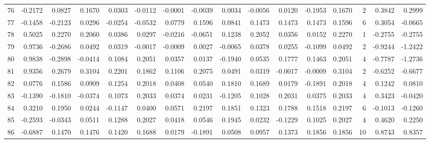 \begin{tabular}{lrrrrrrrrrrrrrrr}
76  &     -0.2172 &  0.0827 &  0.1670 &  0.0303 & -0.0112 & -0.0001 & -0.0039 &  0.0034 & -0.0056 &  0.0120 &  -0.1953 &     0.1670 &      2 &                    0.3842 &                     0.2999 \\
77  &     -0.1458 & -0.2123 &  0.0296 & -0.0254 & -0.0532 &  0.0779 &  0.1596 &  0.0841 &  0.1473 &  0.1473 &   0.1473 &     0.1596 &      6 &                    0.3054 &                    -0.0665 \\
78  &      0.5025 &  0.2270 &  0.2060 &  0.0386 &  0.0297 & -0.0216 & -0.0651 &  0.1238 &  0.2052 &  0.0356 &   0.0152 &     0.2270 &      1 &                   -0.2755 &                    -0.2755 \\
79  &      0.9736 & -0.2686 &  0.0492 &  0.0319 & -0.0017 & -0.0009 &  0.0027 & -0.0065 &  0.0378 &  0.0255 &  -0.1099 &     0.0492 &      2 &                   -0.9244 &                    -1.2422 \\
80  &      0.9838 & -0.2898 & -0.0414 &  0.1084 &  0.2051 &  0.0357 &  0.0137 & -0.1940 &  0.0535 &  0.1777 &   0.1463 &     0.2051 &      4 &                   -0.7787 &                    -1.2736 \\
81  &      0.9356 &  0.2679 &  0.3104 &  0.2201 &  0.1862 &  0.1106 &  0.2075 &  0.0491 &  0.0319 & -0.0017 &  -0.0009 &     0.3104 &      2 &                   -0.6252 &                    -0.6677 \\
82  &      0.0776 &  0.1586 &  0.0909 &  0.1254 &  0.2018 &  0.0408 &  0.0540 &  0.1810 &  0.1689 &  0.0179 &  -0.1891 &     0.2018 &      4 &                    0.1242 &                     0.0810 \\
83  &     -0.1390 & -0.1810 & -0.0374 &  0.1073 &  0.2033 &  0.0374 &  0.0231 & -0.1205 &  0.1028 &  0.2031 &   0.0375 &     0.2033 &      4 &                    0.3423 &                    -0.0420 \\
84  &      0.3210 &  0.1950 &  0.0244 & -0.1147 &  0.0400 &  0.0571 &  0.2197 &  0.1851 &  0.1323 &  0.1788 &   0.1518 &     0.2197 &      6 &                   -0.1013 &                    -0.1260 \\
85  &     -0.2593 & -0.0343 &  0.0511 &  0.1288 &  0.2027 &  0.0418 &  0.0546 &  0.1945 &  0.0232 & -0.1229 &   0.1025 &     0.2027 &      4 &                    0.4620 &                     0.2250 \\
86  &     -0.6887 &  0.1470 &  0.1476 &  0.1420 &  0.1688 &  0.0179 & -0.1891 &  0.0508 &  0.0957 &  0.1373 &   0.1856 &     0.1856 &     10 &                    0.8743 &                     0.8357 \\

\end{tabular}
